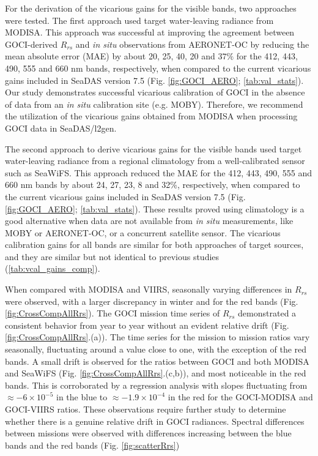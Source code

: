 \documentclass[10pt]{article}
\begin{document}
For the derivation of the vicarious gains for the visible bands, two approaches were tested. The first approach used target water-leaving radiance from MODISA. This approach was successful at improving the agreement between GOCI-derived $R_{rs}$ and {\it in situ} observations from AERONET-OC by reducing the mean absolute error (MAE) by about 20, 25, 40, 20 and $37\%$ for the 412, 443, 490, 555 and 660 nm bands, respectively, when compared to the current vicarious gains included in SeaDAS version 7.5 (Fig. \ref{fig:GOCI_AERO}; \autoref{tab:val_stats}). Our study demonstrates successful vicarious calibration of GOCI in the absence of data from an {\it in situ} calibration site (e.g. MOBY). Therefore, we recommend the utilization of the vicarious gains obtained from MODISA when processing GOCI data in SeaDAS/l2gen.

The second approach to derive vicarious gains for the visible bands used target water-leaving radiance from a regional climatology from a well-calibrated sensor such as SeaWiFS. This approach reduced the MAE for the 412, 443, 490, 555 and 660 nm bands by about 24, 27, 23, 8 and 32\%, respectively, when compared to the current vicarious gains included in SeaDAS version 7.5 (Fig. \ref{fig:GOCI_AERO}; \autoref{tab:val_stats}). These results proved using climatology is a good alternative when data are not available from {\it in situ} measurements, like MOBY or AERONET-OC, or a concurrent satellite sensor. The vicarious calibration gains for all bands are similar for both approaches of target sources, and they are similar but not identical to previous studies \cite{Wang:13,Ahn2015} (\autoref{tab:vcal_gains_comp}).


When compared with MODISA and VIIRS, seasonally varying differences in $R_{rs}$ were observed, with a larger discrepancy in winter and for the red bands (Fig. \ref{fig:CrossCompAllRrs}). The GOCI mission time series of $R_{rs}$ demonstrated a consistent behavior from year to year without an evident relative drift (Fig. \ref{fig:CrossCompAllRrs}.(a)). The time series for the mission to mission ratios vary seasonally, fluctuating around a value close to one, with the exception of the red bands. A small drift is observed for the ratios between GOCI and both MODISA and SeaWiFS (Fig. \ref{fig:CrossCompAllRrs}.(c,b)), and most noticeable in the red bands. This is corroborated by a regression analysis with slopes fluctuating from $\approx-6\times10^{-5}$ in the blue to $\approx-1.9\times10^{-4}$ in the red for the GOCI-MODISA and GOCI-VIIRS ratios. These observations require further study to determine whether there is a genuine relative drift in GOCI radiances. Spectral differences between missions were observed with differences increasing between the blue bands and the red bands (Fig. \ref{fig:scatterRrs})
 
\end{document}
